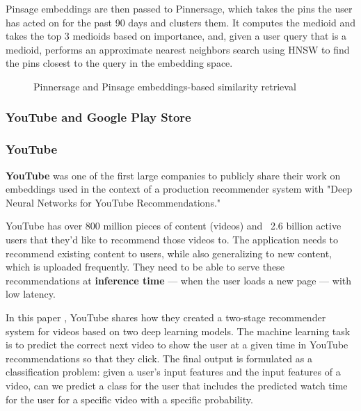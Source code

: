\documentclass[11pt, table]{diazessay} %
\begin{document}
\begin{sloppypar}
Pinsage embeddings are then passed to Pinnersage, which takes the pins the user has acted on for the past 90 days and clusters them. It computes the medioid and takes the top 3 medioids based on importance, and, given a user query that is a medioid, performs an approximate nearest neighbors search using HNSW to find the pins closest to the query in the embedding space.

\begin{figure}[H]
\caption{Pinnersage and Pinsage embeddings-based similarity retrieval}
\end{figure}

\subsubsection{YouTube and Google Play Store}

\subsubsection*{YouTube}
\textbf{YouTube} was one of the first large companies to publicly share their work on embeddings used in the context of a production recommender system with "Deep Neural Networks for YouTube Recommendations."

YouTube has over 800 million pieces of content (videos) and ~2.6 billion active users that they'd like to recommend those videos to. The application needs to recommend existing content to users, while also generalizing to new content, which is uploaded frequently. They need to be able to serve these recommendations at \textbf{inference time} --- when the user loads a new page --- with low latency.

In this paper \citep{covington2016deep}, YouTube shares how they created a two-stage recommender system for videos based on two deep learning models. The machine learning task is to predict the correct next video to show the user at a given time in YouTube recommendations so that they click.  The final output is formulated as a classification problem: given a user's input features and the input features of a video, can we predict a class for the user that includes the predicted watch time for the user for a specific video with a specific probability.


\end{sloppypar}
\end{document}
